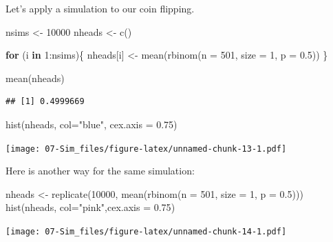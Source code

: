 \documentclass[
]{book}
\newenvironment{Shaded}{\begin{snugshade}}{\end{snugshade}}
\newcommand{\AttributeTok}[1]{\textcolor[rgb]{0.77,0.63,0.00}{#1}}
\newcommand{\ControlFlowTok}[1]{\textcolor[rgb]{0.13,0.29,0.53}{\textbf{#1}}}
\newcommand{\DecValTok}[1]{\textcolor[rgb]{0.00,0.00,0.81}{#1}}
\newcommand{\FloatTok}[1]{\textcolor[rgb]{0.00,0.00,0.81}{#1}}
\newcommand{\FunctionTok}[1]{\textcolor[rgb]{0.00,0.00,0.00}{#1}}
\newcommand{\NormalTok}[1]{#1}
\newcommand{\OtherTok}[1]{\textcolor[rgb]{0.56,0.35,0.01}{#1}}
\newcommand{\SpecialCharTok}[1]{\textcolor[rgb]{0.00,0.00,0.00}{#1}}
\newcommand{\StringTok}[1]{\textcolor[rgb]{0.31,0.60,0.02}{#1}}
\begin{document}
Let's apply a simulation to our coin flipping.

\begin{Shaded}
\begin{Highlighting}[]
\NormalTok{nsims }\OtherTok{\textless{}{-}} \DecValTok{10000}
\NormalTok{nheads }\OtherTok{\textless{}{-}} \FunctionTok{c}\NormalTok{() }

\ControlFlowTok{for}\NormalTok{ (i }\ControlFlowTok{in} \DecValTok{1}\SpecialCharTok{:}\NormalTok{nsims)\{}
\NormalTok{  nheads[i] }\OtherTok{\textless{}{-}} \FunctionTok{mean}\NormalTok{(}\FunctionTok{rbinom}\NormalTok{(}\AttributeTok{n =} \DecValTok{501}\NormalTok{, }\AttributeTok{size =} \DecValTok{1}\NormalTok{, }\AttributeTok{p =} \FloatTok{0.5}\NormalTok{))}
\NormalTok{\}}

\FunctionTok{mean}\NormalTok{(nheads)}
\end{Highlighting}
\end{Shaded}

\begin{verbatim}
## [1] 0.4999669
\end{verbatim}

\begin{Shaded}
\begin{Highlighting}[]
\FunctionTok{hist}\NormalTok{(nheads, }\AttributeTok{col=}\StringTok{"blue"}\NormalTok{, }\AttributeTok{cex.axis =} \FloatTok{0.75}\NormalTok{)}
\end{Highlighting}
\end{Shaded}

\texttt{[image: 07-Sim\_files/figure-latex/unnamed-chunk-13-1.pdf]}

Here is another way for the same simulation:

\begin{Shaded}
\begin{Highlighting}[]
\NormalTok{nheads }\OtherTok{\textless{}{-}} \FunctionTok{replicate}\NormalTok{(}\DecValTok{10000}\NormalTok{, }\FunctionTok{mean}\NormalTok{(}\FunctionTok{rbinom}\NormalTok{(}\AttributeTok{n =} \DecValTok{501}\NormalTok{, }\AttributeTok{size =} \DecValTok{1}\NormalTok{, }\AttributeTok{p =} \FloatTok{0.5}\NormalTok{)))}
\FunctionTok{hist}\NormalTok{(nheads, }\AttributeTok{col=}\StringTok{"pink"}\NormalTok{,}\AttributeTok{cex.axis =} \FloatTok{0.75}\NormalTok{)}
\end{Highlighting}
\end{Shaded}

\texttt{[image: 07-Sim\_files/figure-latex/unnamed-chunk-14-1.pdf]}
\end{document}
